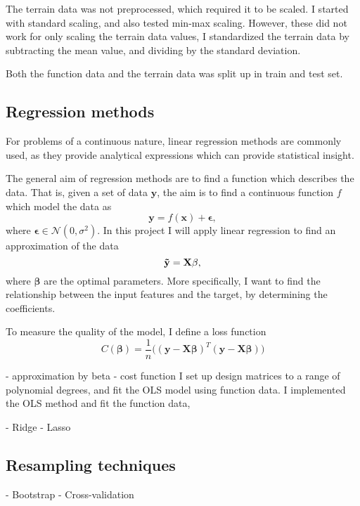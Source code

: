 The terrain data was not preprocessed, which required it to be scaled. I started with standard scaling, and also tested min-max scaling. However, these did not work for only scaling the terrain data values, I standardized the terrain data by subtracting the mean value, and dividing by the standard deviation.

Both the function data and the terrain data was split up in train and test set.

\subsection{Regression methods}\label{ssec:regression_methods}
For problems of a continuous nature, linear regression methods are commonly used, as they provide analytical expressions which can provide statistical insight. 

The general aim of regression methods are to find a function which describes the data. That is, given a set of data $\mathbf{y}$, the aim is to find a continuous function $f$ which model the data as
\begin{equation*}
    \mathbf{y} = f( \mathbf{x} ) + \mathbf{\epsilon}, 
\end{equation*}
where $\mathbf{\epsilon} \in \mathcal{N}(0, \sigma^{2})$. In this project I will apply linear regression to find an approximation of the data 
\begin{equation*}
    \mathbf{\Tilde{y}} = \mathbf{X} \mathbf{\beta},
\end{equation*}
where $\mathbf{\beta}$ are the optimal parameters. More specifically, I want to find the relationship between the input features and the target, by determining the coefficients. 

To measure the quality of the model, I define a loss function 
\begin{equation*}
    C (\mathbf{\beta}) = \frac{1}{n} \big( (\mathbf{y} - \mathbf{X} \mathbf{\beta})^{T} (\mathbf{y} - \mathbf{X} \mathbf{\beta}) \big)
\end{equation*}

- approximation by beta
- cost function
I set up design matrices to a range of polynomial degrees, and fit the OLS model using function data. 
I implemented the OLS method and fit the function data, 

- Ridge
- Lasso

\subsection{Resampling techniques}\label{ssec:resampling_techniques}
- Bootstrap
- Cross-validation

